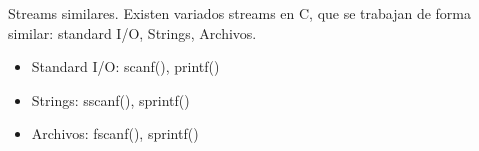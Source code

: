 \documentclass{beamer}
\begin{document}
\begin{frame}[fragile]{Streams similares.}
Existen variados streams en C, que se trabajan de forma similar: standard I/O, Strings, Archivos.
\begin{itemize}
\item Standard I/O: scanf(), printf()
\item Strings: sscanf(), sprintf()
\item Archivos: fscanf(), sprintf()
\end{itemize} 

\end{frame}
%
\end{document}

